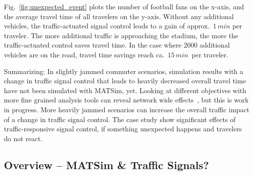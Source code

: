 Fig.~\ref{fig:unexpected_event} plots the number of football fans on
the x-axis, and the average travel time of all travelers on the
y-axis. Without any additional vehicles,
the traffic-actuated signal control leads to a gain of
approx.~$1 \, min$ per traveler.
The more additional traffic is approaching the stadium, the more the traffic-actuated control saves travel time. In the case where 2000 additional vehicles are on the road, travel time savings reach ca.~$15\, min$~per traveler. 

Summarizing: In slightly jammed commuter scenarios, simulation results with a change in traffic signal control that leads to heavily decreased overall travel time have not been simulated with MATSim, yet. 
Looking at different objectives with more fine grained analysis tools can reveal network wide effects~\citep[e.g.~see the analysis using macroscopic fundamental diagrams, pp.114]{Grether2014PhD}, but this is work in progress.  
More heavily jammed scenarios can increase the overall traffic impact of a change in traffic signal control. The case study show significant effects of traffic-responsive signal control, if something unexpected happens and travelers do not react.  

\subsection{Overview -- MATSim \& Traffic Signals?}

